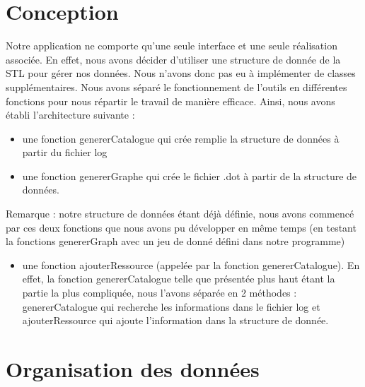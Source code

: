 \documentclass[a4paper]{article}
\begin{document}
\section{Conception}\noindent

	Notre application ne comporte qu'une seule interface et une seule réalisation associée. En effet, nous avons décider d'utiliser une structure de donnée de la STL pour gérer nos données. Nous n'avons donc pas eu à implémenter de classes supplémentaires. Nous avons séparé le fonctionnement de l'outils en différentes fonctions pour nous répartir le travail de manière efficace. Ainsi, nous avons établi l'architecture suivante :\\
	\begin{itemize}
		\item une fonction genererCatalogue qui crée remplie la structure de données à partir du fichier log
		\item une fonction genererGraphe qui crée le fichier .dot à partir de la structure de données. 
		\end{itemize}
		\bigbreak
		Remarque : notre structure de données étant déjà définie, nous avons commencé par ces deux fonctions que nous avons pu développer en même temps (en testant la fonctions genererGraph avec un jeu de donné défini dans notre programme)
	\\
	\begin{itemize}
	\item une fonction ajouterRessource (appelée par la fonction genererCatalogue). En effet, la fonction genererCatalogue telle que présentée plus haut étant la partie la plus compliquée, nous l'avons séparée en 2 méthodes : genererCatalogue qui recherche les informations dans le fichier log et ajouterRessource qui ajoute l'information dans la structure de donnée.
	\end{itemize}

\newpage
\section{Organisation des données}\noindent
\end{document}
